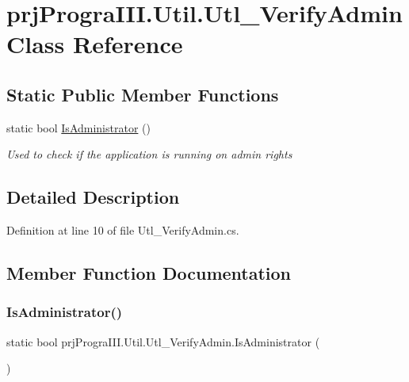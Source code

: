 \hypertarget{classprj_progra_i_i_i_1_1_util_1_1_utl___verify_admin}{}\section{prj\+Progra\+I\+I\+I.\+Util.\+Utl\+\_\+\+Verify\+Admin Class Reference}
\label{classprj_progra_i_i_i_1_1_util_1_1_utl___verify_admin}
\subsection*{Static Public Member Functions}
\begin{DoxyCompactItemize}
\item 
static bool \hyperlink{classprj_progra_i_i_i_1_1_util_1_1_utl___verify_admin_a81d5e3e9121214076feb28e419772053}{Is\+Administrator} ()
\begin{DoxyCompactList}\small\item\em Used to check if the application is running on admin rights \end{DoxyCompactList}\end{DoxyCompactItemize}


\subsection{Detailed Description}


Definition at line 10 of file Utl\+\_\+\+Verify\+Admin.\+cs.



\subsection{Member Function Documentation}
\hypertarget{classprj_progra_i_i_i_1_1_util_1_1_utl___verify_admin_a81d5e3e9121214076feb28e419772053}{}\label{classprj_progra_i_i_i_1_1_util_1_1_utl___verify_admin_a81d5e3e9121214076feb28e419772053} 
\subsubsection{\texorpdfstring{Is\+Administrator()}{IsAdministrator()}}
{\footnotesize\ttfamily static bool prj\+Progra\+I\+I\+I.\+Util.\+Utl\+\_\+\+Verify\+Admin.\+Is\+Administrator (\begin{DoxyParamCaption}{ }\end{DoxyParamCaption})\hspace{0.3cm}{\ttfamily [static]}}



